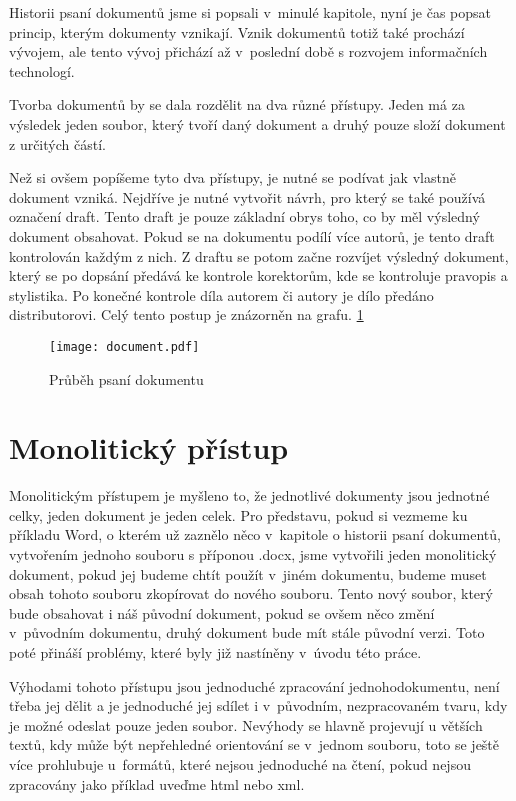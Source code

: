 Historii psaní dokumentů jsme si popsali v~minulé kapitole, nyní je čas popsat princip, kterým dokumenty vznikají. Vznik dokumentů totiž také prochází
vývojem, ale tento vývoj přichází až v~poslední době s rozvojem informačních technologí.

Tvorba dokumentů by se dala rozdělit na dva různé přístupy.
Jeden má za výsledek jeden soubor, který tvoří daný dokument a druhý pouze složí dokument z určitých částí.

Než si ovšem popíšeme tyto dva přístupy, je nutné se podívat jak vlastně dokument vzniká. Nejdříve je nutné vytvořit návrh, pro který se také používá
označení draft. Tento draft je pouze základní obrys toho, co by měl výsledný dokument obsahovat. Pokud se na dokumentu podílí více autorů, je
tento draft kontrolován každým z nich. Z draftu se potom začne rozvíjet výsledný dokument, který se po dopsání předává ke kontrole korektorům,
kde se \mbox{kontroluje} pravopis a stylistika. Po konečné kontrole díla autorem či autory je dílo předáno distributorovi. Celý tento postup
je znázorněn na grafu. \ref{fig:linflow}

\begin{figure}[h]
    \centering
    \texttt{[image: document.pdf]}
    \caption{Průběh psaní dokumentu}
    \label{fig:linflow}
\end{figure}

\section{Monolitický přístup}

Monolitickým přístupem je myšleno to, že jednotlivé dokumenty jsou jednotné celky, jeden dokument je jeden celek. Pro představu, pokud si vezmeme ku příkladu
Word, o kterém už zaznělo něco v~kapitole o historii psaní dokumentů, vytvořením jednoho souboru s příponou .docx, jsme vytvořili jeden monolitický dokument, pokud jej
budeme chtít použít v~jiném dokumentu, budeme muset obsah tohoto souboru zkopírovat do nového souboru. Tento nový soubor, který bude obsahovat i náš původní dokument,
pokud se ovšem něco změní v~původním dokumentu, druhý dokument bude mít stále původní verzi. Toto poté přináší problémy, které byly již nastíněny v~úvodu této práce.

Výhodami tohoto přístupu jsou jednoduché zpracování jednoho\linebreak dokumentu, není třeba jej dělit a je jednoduché jej sdílet i v~původním, nezpracovaném tvaru, kdy je
možné odeslat pouze jeden soubor. Nevýhody se hlavně projevují u větších textů, kdy může být nepřehledné orientování se v~jednom souboru, toto se ještě více
prohlubuje u~formátů, které nejsou jednoduché na čtení, pokud nejsou zpracovány jako příklad uveďme \gls{html} nebo \gls{xml}.

